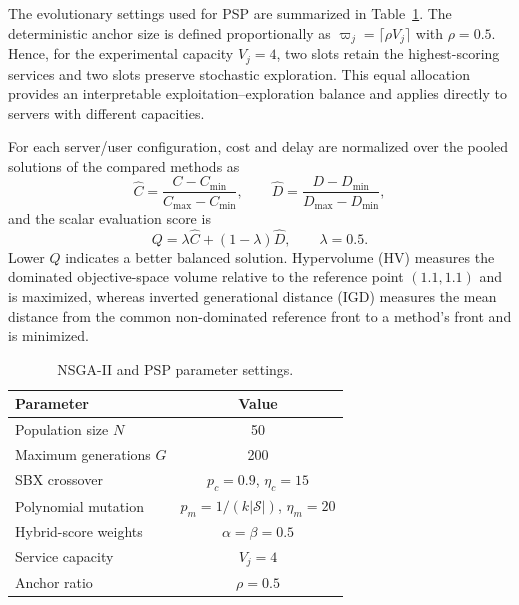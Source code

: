 \documentclass[10pt, conference, letterpaper]{IEEEtran}
\begin{document}
The evolutionary settings used for PSP are summarized in Table~\ref{tab:psp_parameters}. The deterministic anchor size is defined proportionally as $\varpi_j=\lceil\rho V_j\rceil$ with $\rho=0.5$. Hence, for the experimental capacity $V_j=4$, two slots retain the highest-scoring services and two slots preserve stochastic exploration. This equal allocation provides an interpretable exploitation--exploration balance and applies directly to servers with different capacities.

For each server/user configuration, cost and delay are normalized over the pooled solutions of the compared methods as
\begin{equation}
\widehat{C}=\frac{C-C_{\min}}{C_{\max}-C_{\min}},\qquad
\widehat{D}=\frac{D-D_{\min}}{D_{\max}-D_{\min}},
\label{eq:q_normalization}
\end{equation}
and the scalar evaluation score is
\begin{equation}
Q=\lambda\widehat{C}+(1-\lambda)\widehat{D},\qquad \lambda=0.5.
\label{eq:q_score}
\end{equation}
Lower $Q$ indicates a better balanced solution. Hypervolume (HV) measures the dominated objective-space volume relative to the reference point $(1.1,1.1)$ and is maximized, whereas inverted generational distance (IGD) measures the mean distance from the common non-dominated reference front to a method's front and is minimized.


\begin{table}[!t]
\centering

\caption{NSGA-II and PSP parameter settings.}
\label{tab:psp_parameters}
\small
\begin{tabular}{|l|c|}
\hline
Parameter & Value \\ \hline
Population size $N$ & 50 \\ \hline
Maximum generations $G$ & 200 \\ \hline
SBX crossover & $p_c=0.9$, $\eta_c=15$ \\ \hline
Polynomial mutation & $p_m=1/(k|\mathcal{S}|)$, $\eta_m=20$ \\ \hline
Hybrid-score weights & $\alpha=\beta=0.5$ \\ \hline
Service capacity & $V_j=4$ \\ \hline
Anchor ratio & $\rho=0.5$ \\ \hline
\end{tabular}
\end{table}
\end{document}
